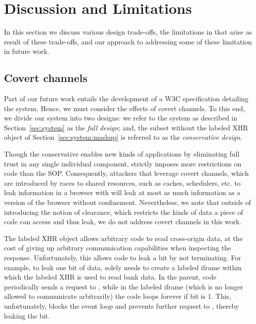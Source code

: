 \section{Discussion and Limitations}
\label{sec:discussion}

In this section we discuss various design trade-offs, the limitations
in \sys{} that arise as result of these trade-offs, and our approach
to addressing some of these limitation in future work.


\subsection{Covert channels}
\label{sec:discussion:covert}

Part of our future work entails the development of a W3C
specification detailing the \sys{} system.
%
Hence, we must consider the effects of covert channels.
%
To this end, we divide our system into two designs:
%
we refer to the system as described in
Section~\ref{sec:system} as the \emph{full design};
and, the subset without the labeled XHR object of
Section~\ref{sec:system:mashup} is referred to as the
\emph{conservative design}.

Though the conservative \sys{} enables new kinds of applications by
eliminating full trust in any single individual component, \sys{}
strictly imposes more restrictions on code than the SOP.
%
Consequently, attackers that leverage covert channels, which are
introduced by races to shared resources, such as caches, schedulers,
etc. to leak information in a browser with \sys{} will leak at most as
much information as a version of the browser without confinement.
%
Nevertheless, we note that outside of introducing the notion of
clearance, which restricts the kinds of data a piece of code can
access and thus leak, we do not address covert channels in this work. 

%


The labeled XHR object allows arbitrary code to read cross-origin
data, at the cost of giving up arbitrary communication capabilities
when inspecting the response.
%
Unfortunately, this allows code to leak a bit by not terminating.
%
For example, to leak one bit of  data, 
solely needs to create a labeled iframe within which the labeled XHR
is used to read bank data.
%
In the parent, code periodically sends a request to ,
while in the labeled iframe (which is no longer allowed to communicate
arbitrarily) the code loops forever if bit is 1.
%
This, unfortunately, blocks the event loop and prevents further
request to , thereby leaking the bit.



